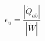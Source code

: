 

\item[d)]
    \begin{equation}
        \epsilon_u = \frac{\left| \dot{Q}_{ab} \right|}{\left| \dot{W} \right|}
    \end{equation}